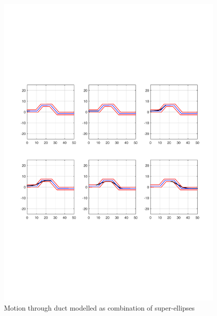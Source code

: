 \documentclass[12pt,a4]{article}
\begin{document}
\begin{figure}[h]
\centering
\includegraphics[scale=0.5]{figures/fig5.pdf}
\caption{ Motion through duct modelled as combination of super-ellipses\label{fig:ductasSEs}}
\end{figure}
\end{document}
